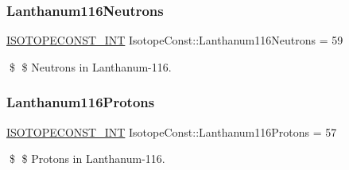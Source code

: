 \subsubsection{\texorpdfstring{Lanthanum116\+Neutrons}{Lanthanum116Neutrons}}
{\footnotesize\ttfamily \mbox{\hyperlink{group___isotope_const-_macros_ga5f18360b3e99483a35c32d789e62621c}{I\+S\+O\+T\+O\+P\+E\+C\+O\+N\+S\+T\+\_\+\+I\+NT}} Isotope\+Const\+::\+Lanthanum116\+Neutrons = 59}

\$ \$ Neutrons in Lanthanum-\/116. \mbox{\label{group___isotope_const-_lanthanum-_la116_ga542f0801f09a53fb63fd7d681117b72f}} 
\subsubsection{\texorpdfstring{Lanthanum116\+Protons}{Lanthanum116Protons}}
{\footnotesize\ttfamily \mbox{\hyperlink{group___isotope_const-_macros_ga5f18360b3e99483a35c32d789e62621c}{I\+S\+O\+T\+O\+P\+E\+C\+O\+N\+S\+T\+\_\+\+I\+NT}} Isotope\+Const\+::\+Lanthanum116\+Protons = 57}

\$ \$ Protons in Lanthanum-\/116. 
